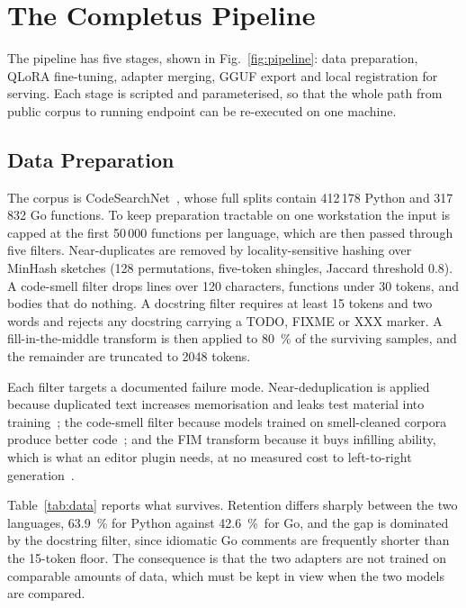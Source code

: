 \documentclass[10pt,conference,a4paper]{IEEEtran}
\begin{document}
\section{The Completus Pipeline}
The pipeline has five stages, shown in Fig.~\ref{fig:pipeline}: data
preparation, QLoRA fine-tuning, adapter merging, GGUF export and local
registration for serving. Each stage is scripted and parameterised, so that
the whole path from public corpus to running endpoint can be re-executed on
one machine.


\subsection{Data Preparation}
\label{sec:data}
The corpus is CodeSearchNet~\cite{husain2019}, whose full splits contain
412\,178 Python and 317\,832 Go functions. To keep preparation tractable on
one workstation the input is capped at the first 50\,000 functions per
language, which are then passed through five filters. Near-duplicates are removed by
locality-sensitive hashing over MinHash sketches (128 permutations,
five-token shingles, Jaccard threshold 0.8). A code-smell filter drops lines
over 120 characters, functions under 30 tokens, and bodies that do nothing. A docstring filter requires at least 15
tokens and two words and rejects any docstring carrying a TODO, FIXME or XXX
marker. A fill-in-the-middle transform is then applied to 80~\% of the
surviving samples, and the remainder are truncated to 2048 tokens.

Each filter targets a documented failure mode. Near-deduplication is applied
because duplicated text increases memorisation and leaks test material into
training~\cite{lee2022};
the code-smell filter because models trained on smell-cleaned corpora produce
better code~\cite{xue2025}; and the FIM transform because it buys infilling
ability, which is what an editor plugin needs, at no measured cost to
left-to-right generation~\cite{bavarian2022}.

Table~\ref{tab:data} reports what survives. Retention differs sharply
between the two languages, 63.9~\% for Python against 42.6~\%~for Go, and
the gap is dominated by the docstring filter, since idiomatic Go comments are
frequently shorter than the 15-token floor. The consequence is that the two
adapters are not trained on comparable amounts of data, which must be kept in
view when the two models are compared.
\end{document}
